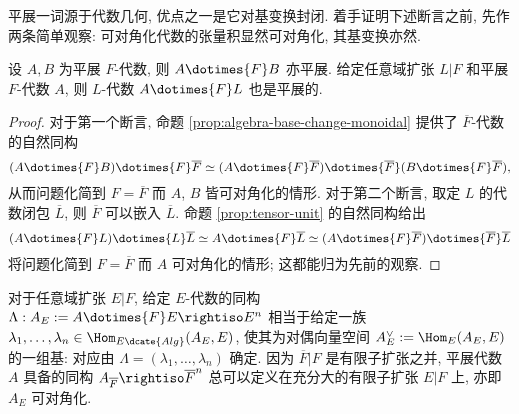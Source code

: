 平展一词源于代数几何, 优点之一是它对基变换封闭. 着手证明下述断言之前, 先作两条简单观察: 可对角化代数的张量积显然可对角化, 其基变换亦然.
\begin{lemma}\label{prop:etale-algebra-basechange}
	设 $A, B$ 为平展 $F$-代数, 则 $A \dotimes{F} B$ 亦平展. 给定任意域扩张 $L|F$ 和平展 $F$-代数 $A$, 则 $L$-代数 $A \dotimes{F} L$ 也是平展的.
\end{lemma}
\begin{proof}
	对于第一个断言, 命题 \ref{prop:algebra-base-change-monoidal} 提供了 $\overline{F}$-代数的自然同构
	\[ (A \dotimes{F} B) \dotimes{F} \overline{F} \simeq (A \dotimes{F} \overline{F}) \dotimes{\overline{F}} (B \dotimes{F} \overline{F}), \]
	从而问题化简到 $F=\overline{F}$ 而 $A$, $B$ 皆可对角化的情形. 对于第二个断言, 取定 $L$ 的代数闭包 $\overline{L}$, 则 $\overline{F}$ 可以嵌入 $\overline{L}$. 命题 \ref{prop:tensor-unit} 的自然同构给出
	\[ (A \dotimes{F} L) \dotimes{L} \overline{L} \simeq A \dotimes{F} \overline{L} \simeq (A \dotimes{F} \overline{F}) \dotimes{\overline{F}} \overline{L} \]
	将问题化简到 $F=\overline{F}$ 而 $A$ 可对角化的情形; 这都能归为先前的观察.
\end{proof}

对于任意域扩张 $E|F$, 给定 $E$-代数的同构 $\Lambda: A_E := A \dotimes{F} E \rightiso E^n$ 相当于给定一族 $\lambda_1, \ldots, \lambda_n \in \Hom_{E\dcate{Alg}}(A_E, E)$, 使其为对偶向量空间 $A_E^\vee := \Hom_E(A_E, E)$ 的一组基: 对应由 $\Lambda = (\lambda_1, \ldots, \lambda_n)$ 确定. 因为 $\overline{F}|F$ 是有限子扩张之并, 平展代数 $A$ 具备的同构 $A_{\overline{F}} \rightiso \overline{F}^n$ 总可以定义在充分大的有限子扩张 $E|F$ 上, 亦即 $A_E$ 可对角化.

